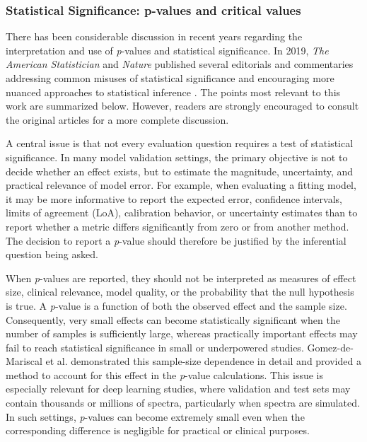\subsubsection{Statistical Significance: p-values and critical values}
\label{sec:perf:subsec:awareness:subsubsed:p-values}
There has been considerable discussion in recent years regarding the interpretation and use of \textit{p}-values and statistical significance. In 2019, \textit{The American Statistician} and \textit{Nature} published several editorials and commentaries addressing common misuses of statistical significance and encouraging more nuanced approaches to statistical inference \cite{Amrhein2019, Nature2019, Wasserstein2019}. The points most relevant to this work are summarized below. However, readers are strongly encouraged to consult the original articles for a more complete discussion.

A central issue is that not every evaluation question requires a test of statistical significance. In many model validation settings, the primary objective is not to decide whether an effect exists, but to estimate the magnitude, uncertainty, and practical relevance of model error. For example, when evaluating a fitting model, it may be more informative to report the expected error, confidence intervals, limits of agreement (LoA), calibration behavior, or uncertainty estimates than to report whether a metric differs significantly from zero or from another method. The decision to report a \textit{p}-value should therefore be justified by the inferential question being asked.

When \textit{p}-values are reported, they should not be interpreted as measures of effect size, clinical relevance, model quality, or the probability that the null hypothesis is true. A \textit{p}-value is a function of both the observed effect and the sample size. Consequently, very small effects can become statistically significant when the number of samples is sufficiently large, whereas practically important effects may fail to reach statistical significance in small or underpowered studies. Gomez-de-Mariscal et al. \cite{Gomez-de-Mariscal2021} demonstrated this sample-size dependence in detail and provided a method to account for this effect in the \textit{p}-value calculations. This issue is especially relevant for deep learning studies, where validation and test sets may contain thousands or millions of spectra, particularly when spectra are simulated. In such settings, \textit{p}-values can become extremely small even when the corresponding difference is negligible for practical or clinical purposes.

